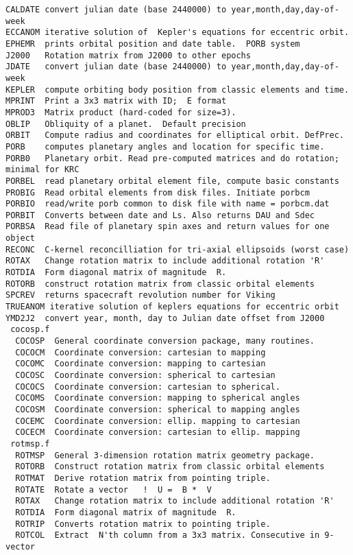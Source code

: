 \documentclass[draft]{article}
\begin{document}
\begin{verbatim}
CALDATE convert julian date (base 2440000) to year,month,day,day-of-week
ECCANOM iterative solution of  Kepler's equations for eccentric orbit.
EPHEMR  prints orbital position and date table.  PORB system
J2000   Rotation matrix from J2000 to other epochs
JDATE   convert julian date (base 2440000) to year,month,day,day-of-week
KEPLER  compute orbiting body position from classic elements and time.
MPRINT  Print a 3x3 matrix with ID;  E format
MPROD3  Matrix product (hard-coded for size=3).
OBLIP   Obliquity of a planet.  Default precision
ORBIT   Compute radius and coordinates for elliptical orbit. DefPrec.
PORB    computes planetary angles and location for specific time.
PORB0   Planetary orbit. Read pre-computed matrices and do rotation; minimal for KRC
PORBEL  read planetary orbital element file, compute basic constants 
PROBIG  Read orbital elements from disk files. Initiate porbcm
PORBIO  read/write porb common to disk file with name = porbcm.dat 
PORBIT  Converts between date and Ls. Also returns DAU and Sdec
PORBSA  Read file of planetary spin axes and return values for one object
RECONC 	C-kernel reconcilliation for tri-axial ellipsoids (worst case)
ROTAX   Change rotation matrix to include additional rotation 'R'
ROTDIA  Form diagonal matrix of magnitude  R.
ROTORB  construct rotation matrix from classic orbital elements
SPCREV  returns spacecraft revolution number for Viking
TRUEANOM iterative solution of keplers equations for eccentric orbit
YMD2J2  convert year, month, day to Julian date offset from J2000
 cocosp.f
  COCOSP  General coordinate conversion package, many routines.
  COCOCM  Coordinate conversion: cartesian to mapping
  COCOMC  Coordinate conversion: mapping to cartesian
  COCOSC  Coordinate conversion: spherical to cartesian
  COCOCS  Coordinate conversion: cartesian to spherical.
  COCOMS  Coordinate conversion: mapping to spherical angles
  COCOSM  Coordinate conversion: spherical to mapping angles
  COCEMC  Coordinate conversion: ellip. mapping to cartesian
  COCECM  Coordinate conversion: cartesian to ellip. mapping
 rotmsp.f
  ROTMSP  General 3-dimension rotation matrix geometry package.
  ROTORB  Construct rotation matrix from classic orbital elements 
  ROTMAT  Derive rotation matrix from pointing triple.
  ROTATE  Rotate a vector 	!  U =  B *  V
  ROTAX   Change rotation matrix to include additional rotation 'R'
  ROTDIA  Form diagonal matrix of magnitude  R.
  ROTRIP  Converts rotation matrix to pointing triple.
  ROTCOL  Extract  N'th column from a 3x3 matrix. Consecutive in 9-vector

\end{verbatim}
\end{document}
